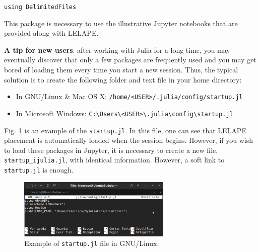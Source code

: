 \vspace{1mm}
\begin{center}
	\texttt{using DelimitedFiles}
\end{center}
\vspace{1mm}	

This package is necessary to use the illustrative Jupyter notebooks that are provided along with LELAPE.

\textbf{A tip for new users}: after working with Julia for a long time, you may eventually discover that only a few packages are frequently used and  you may get bored of loading them every time you start a new session. Thus, the typical solution is to create the following folder and text file in your home directory:
%
\begin{itemize}
	\item In GNU/Linux \& Mac OS X: \texttt{/home/<USER>/.julia/config/startup.jl}
	\item In Microsoft Windows: \texttt{C:{\textbackslash}Users{\textbackslash}<USER>{\textbackslash}.julia{\textbackslash}config{\textbackslash}startup.jl}
\end{itemize}  
%
Fig. \ref{Fig:startup.jl} is an example of the \texttt{startup.jl}. In this file, one can see that LELAPE placement is automatically loaded when the session begins. However, if you wish to load these packages in Jupyter, it is necessary to create a new file, \texttt{startup\_ijulia.jl}, with identical information. However, a soft link to \texttt{startup.jl} is enough.
%
\begin{figure}
	\centering
	\includegraphics[width=0.65\textwidth]{fig/startup.jl}
	\caption{Example of \texttt{startup.jl} file in GNU/Linux.}
	\label{Fig:startup.jl}
\end{figure} 